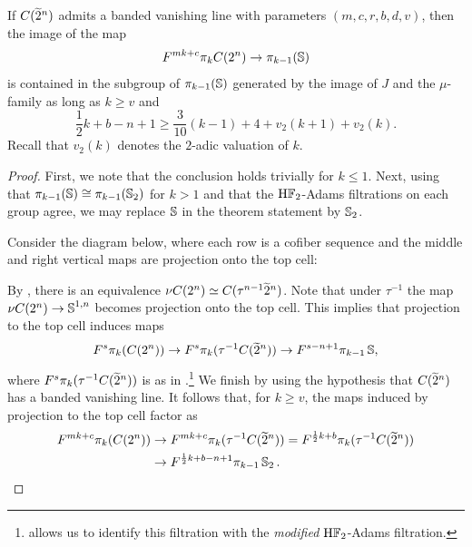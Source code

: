 \begin{prop} \label{prop:I-want-to-be-done}
  If $C(\wt{2}^n)$ admits a banded vanishing line with parameters $(m, c, r, b, d, v)$, then
  the image of the map
  $$ F^{mk+c}\pi_k C(2^n) \to \pi_{k-1}(\operatorname{\mathbb{S}}) $$
  is contained in the subgroup of $\pi_{k-1}(\operatorname{\mathbb{S}})$ generated by the image of $J$ and the $\mu$-family as long as $ k \geq v$ and
  $$ \frac{1}{2}k + b - n + 1 \geq \frac{3}{10}(k-1) + 4 + v_2(k+1) + v_2(k). $$
  Recall that $v_2 (k)$ denotes the $2$-adic valuation of $k$.
\end{prop}

\begin{proof}
  First, we note that the conclusion holds trivially for $k \leq 1$.
  Next, using that $\pi_{k-1}(\operatorname{\mathbb{S}}) \cong \pi_{k-1}(\operatorname{\mathbb{S}}_2)$ for $k > 1$ and that the $\mathrm{H}\mathbb{F}_2$-Adams filtrations on each group agree, we may replace $\operatorname{\mathbb{S}}$ in the theorem statement by $\operatorname{\mathbb{S}}_2$. 

  Consider the diagram below, where each row is a cofiber sequence and the middle and right vertical maps are projection onto the top cell:
  \begin{center}
  \end{center}
  By , there is an equivalence $ \nu C(2^n) \simeq C(\tau^{n-1} \wt{2}^n) $.
  Note that under $\tau^{-1}$ the map $\nu C(2^n) \to \operatorname{\mathbb{S}}^{1,n}$ becomes projection onto the top cell.
  This implies that projection to the top cell induces maps
  $$ F^{s} \pi_k( C(2^n)) \to F^s \pi_k (\tau^{-1} C(\wt{2}^n)) \to F^{s-n+1} \pi_{k-1} \Ss, $$
  where $ F^s \pi_k(\tau^{-1} C(\wt{2}^n)) $ is as in .\footnote{  allows us to identify this filtration with the \emph{modified} $\mathrm{H}\mathbb{F}_2$-Adams filtration.}
  We finish by using the hypothesis that $C(\wt{2}^n)$ has a banded vanishing line.
  It follows that, for $k \geq v$, the maps induced by projection to the top cell factor as
  \begin{align*}
    F^{mk + c} \pi_k (C(2^n))
    &\to F^{mk + c} \pi_k (\tau^{-1} C(\wt{2}^n) )
    = F^{\frac{1}{2}k + b} \pi_k (\tau^{-1} C(\wt{2}^n) )\\
    &\to F^{\frac{1}{2}k + b - n + 1} \pi_{k-1} \Ss_2.
  \end{align*}
  

\end{proof}
